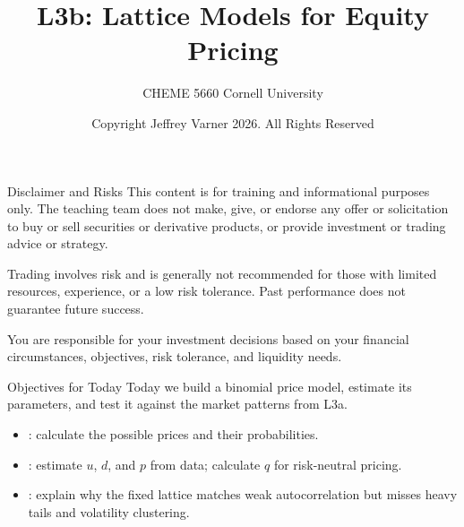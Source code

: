 \documentclass[aspectratio=169,11pt]{beamer}
\title{\texorpdfstring{{\vnheavy L3b}}{L3b}: Lattice Models for Equity Pricing}
\subtitle{CHEME 5660 Cornell University}
\author{Copyright Jeffrey Varner 2026. All Rights Reserved}
\begin{document}
\vntitlepage

\begin{frame}{Disclaimer and Risks}
  \vspace{0.6em}
  \textbf{} This content is for training and informational
  purposes only. The teaching team does not make, give, or endorse any offer or
  solicitation to buy or sell securities or derivative products, or provide
  investment or trading advice or strategy.

  \vspace{1.1em}
  \textbf{} Trading involves risk and is generally not recommended for
  those with limited resources, experience, or a low risk tolerance. Past
  performance does not guarantee future success.

  \vspace{1.1em}
  \textbf{} You are responsible for your investment decisions
  based on your financial circumstances, objectives, risk tolerance, and
  liquidity needs.
\end{frame}

\begin{frame}{Objectives for Today}
  Today we build a binomial price model, estimate its parameters, and
  test it against the market patterns from L3a.

  \vspace{0.9em}
  {\large\textbf{}}
  \vspace{0.4em}
  \begin{itemize}\setlength{\itemsep}{0.7em}
    \item {}: calculate the possible prices
      and their probabilities.
    \item {}: estimate $u$, $d$, and $p$ from data;
      calculate $q$ for risk-neutral pricing.
    \item {}: explain why the fixed lattice matches
      weak autocorrelation but misses heavy tails and volatility clustering.
  \end{itemize}

\end{frame}
\end{document}

